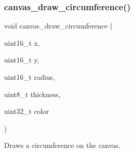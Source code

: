 \subsubsection{\texorpdfstring{canvas\+\_\+draw\+\_\+circumference()}{canvas\_draw\_circumference()}}
{\footnotesize\ttfamily void canvas\+\_\+draw\+\_\+circumference (\begin{DoxyParamCaption}\item[{uint16\+\_\+t}]{x,  }\item[{uint16\+\_\+t}]{y,  }\item[{uint16\+\_\+t}]{radius,  }\item[{uint8\+\_\+t}]{thickness,  }\item[{uint32\+\_\+t}]{color }\end{DoxyParamCaption})}



Draws a circumference on the canvas. 


